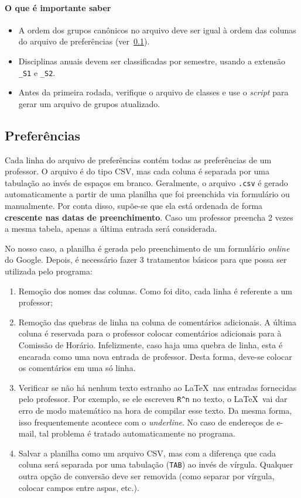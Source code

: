 \documentclass[a4paper, 12pt]{report}
\begin{document}
\paragraph{O que é importante saber}

\begin{itemize}
\item A ordem dos grupos canônicos no arquivo deve ser igual à ordem
  das colunas do arquivo de preferências (ver~\ref{conf:pref}).

\item Disciplinas anuais devem ser classificadas por semestre, usando
  a extensão \texttt{\_S1} e \texttt{\_S2}.

\item Antes da primeira rodada, verifique o arquivo de classes e use o
  \textit{script} para gerar um arquivo de grupos atualizado.
\end{itemize}

\subsection{Preferências} \label{conf:pref}

Cada linha do arquivo de preferências contém todas as preferências de
um professor. O arquivo é do tipo CSV, mas cada coluna é separada por
uma tabulação ao invés de espaços em branco. Geralmente, o arquivo
\texttt{.csv} é gerado automaticamente a partir de uma planilha que
foi preenchida via formulário ou manualmente. Por conta disso,
supõe-se que ela está ordenada de forma \textbf{crescente nas datas de
  preenchimento}. Caso um professor preencha 2 vezes a mesma tabela,
apenas a última entrada será considerada.

No nosso caso, a planilha é gerada pelo preenchimento de um formulário
\textit{online} do Google. Depois, é necessário fazer 3 tratamentos
básicos para que possa ser utilizada pelo programa:
\begin{enumerate}
\item Remoção dos nomes das colunas. Como foi dito, cada linha é
  referente a um professor;
\item Remoção das quebras de linha na coluna de comentários
  adicionais. A última coluna é reservada para o professor colocar
  comentários adicionais para à Comissão de Horário. Infelizmente,
  caso haja uma quebra de linha, esta é encarada como uma nova entrada
  de professor. Desta forma, deve-se colocar os comentários em uma só
  linha.
\item Verificar se não há nenhum texto estranho ao \LaTeX\ nas entradas
  fornecidas pelo professor. Por exemplo, se ele escreveu \verb+R^n+
  no texto, o \LaTeX\ vai dar erro de modo matemático na hora de
  compilar esse texto. Da mesma forma, isso frequentemente acontece
  com o \textit{underline}. No caso de endereços de e-mail, tal
  problema é tratado automaticamente no programa.
\item Salvar a planilha como um arquivo CSV, mas com a diferença que
  cada coluna será separada por uma tabulação (\texttt{TAB}) ao invés
  de vírgula. Qualquer outra opção de conversão deve ser removida
  (como separar por vírgula, colocar campos entre aspas, etc.).
\end{enumerate}
\end{document}
